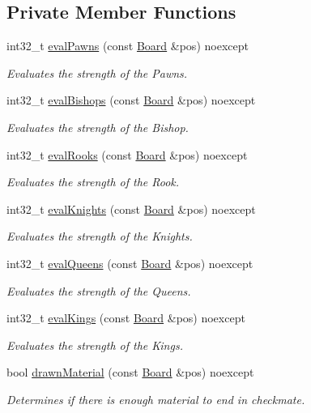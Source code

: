 \subsection*{Private Member Functions}
\begin{DoxyCompactItemize}
\item 
int32\+\_\+t \mbox{\hyperlink{classEvaluator_a76e81d148449a9bb6c1616895223ad77}{eval\+Pawns}} (const \mbox{\hyperlink{classBoard}{Board}} \&pos) noexcept
\begin{DoxyCompactList}\small\item\em Evaluates the strength of the Pawns. \end{DoxyCompactList}\item 
int32\+\_\+t \mbox{\hyperlink{classEvaluator_ab8235a37e631665e0dbdbffdddf015f7}{eval\+Bishops}} (const \mbox{\hyperlink{classBoard}{Board}} \&pos) noexcept
\begin{DoxyCompactList}\small\item\em Evaluates the strength of the Bishop. \end{DoxyCompactList}\item 
int32\+\_\+t \mbox{\hyperlink{classEvaluator_ac1cfc6e10fcd71fc4148415d889a4085}{eval\+Rooks}} (const \mbox{\hyperlink{classBoard}{Board}} \&pos) noexcept
\begin{DoxyCompactList}\small\item\em Evaluates the strength of the Rook. \end{DoxyCompactList}\item 
int32\+\_\+t \mbox{\hyperlink{classEvaluator_aaf81df6872cb3c5acabc05b4865c4bcd}{eval\+Knights}} (const \mbox{\hyperlink{classBoard}{Board}} \&pos) noexcept
\begin{DoxyCompactList}\small\item\em Evaluates the strength of the Knights. \end{DoxyCompactList}\item 
int32\+\_\+t \mbox{\hyperlink{classEvaluator_a322d577548dd00c32e949cad62a17393}{eval\+Queens}} (const \mbox{\hyperlink{classBoard}{Board}} \&pos) noexcept
\begin{DoxyCompactList}\small\item\em Evaluates the strength of the Queens. \end{DoxyCompactList}\item 
int32\+\_\+t \mbox{\hyperlink{classEvaluator_af8971fc82010e0a08a1e510847bf304c}{eval\+Kings}} (const \mbox{\hyperlink{classBoard}{Board}} \&pos) noexcept
\begin{DoxyCompactList}\small\item\em Evaluates the strength of the Kings. \end{DoxyCompactList}\item 
bool \mbox{\hyperlink{classEvaluator_aec21b1e28f162b7f1e4edc9e8f725a8b}{drawn\+Material}} (const \mbox{\hyperlink{classBoard}{Board}} \&pos) noexcept
\begin{DoxyCompactList}\small\item\em Determines if there is enough material to end in checkmate. \end{DoxyCompactList}\end{DoxyCompactItemize}


